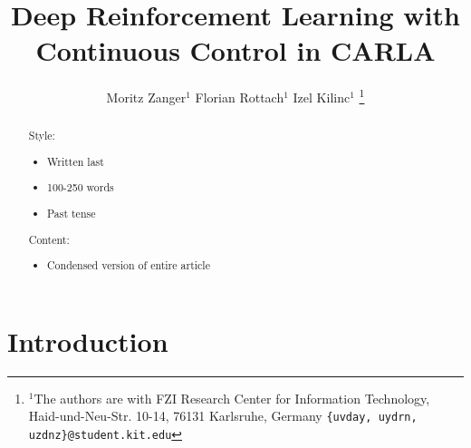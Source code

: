 \documentclass[letterpaper, 10 pt, conference]{ieeeconf}  %
\title{\LARGE \bf
Deep Reinforcement Learning with Continuous Control in CARLA
}
\author{Moritz Zanger$^{1}$ Florian Rottach$^{1}$ Izel Kilinc$^{1}$ %
\thanks{$^{1}$The authors are with FZI Research Center for Information Technology, Haid-und-Neu-Str. 10-14, 76131 Karlsruhe, Germany
        {\tt\small \{uvday, uydrn, uzdnz\}@student.kit.edu}}%
}
\begin{document}
\maketitle
\thispagestyle{empty}
\pagestyle{empty}


\begin{abstract}


Style:
\begin{itemize}
	\item Written last
	\item 100-250 words
	\item Past tense
\end{itemize}

Content:
\begin{itemize}
	\item Condensed version of entire article
\end{itemize}

\end{abstract}


\section{Introduction}

\end{document}
